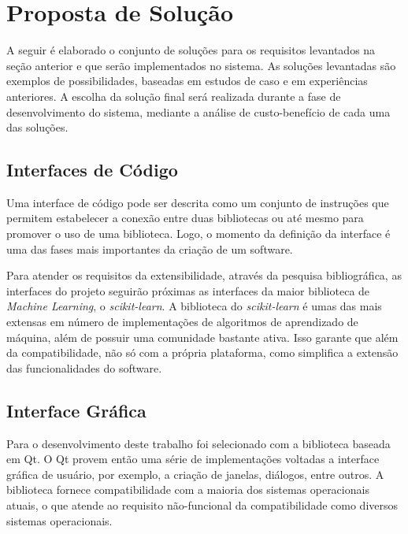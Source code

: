 

\section{Proposta de Solução}
    \label{sec:proposta-de-solucao}

    A seguir é elaborado o conjunto de soluções para os requisitos levantados na seção anterior e que serão implementados no sistema. As soluções levantadas são exemplos de possibilidades, baseadas em estudos de caso e em experiências anteriores. A escolha da solução final será realizada durante a fase de desenvolvimento do sistema, mediante a análise de custo-benefício de cada uma das soluções.

    \subsection{Interfaces de Código}

    Uma interface de código pode ser descrita como um conjunto de instruções que permitem estabelecer a conexão entre duas bibliotecas ou até mesmo para promover o uso de uma biblioteca. Logo, o momento da definição da interface é uma das fases mais importantes da criação de um software.

    Para atender os requisitos da extensibilidade, através da pesquisa bibliográfica, as interfaces do projeto seguirão próximas as interfaces da maior biblioteca de \textit{Machine Learning}, o \textit{scikit-learn}. A biblioteca do \textit{scikit-learn} é umas das mais extensas em número de implementações de algoritmos de aprendizado de máquina, além de possuir uma comunidade bastante ativa. Isso garante que além da compatibilidade, não só com a própria plataforma, como simplifica a extensão das funcionalidades do software.

    \subsection{Interface Gráfica}

    Para o desenvolvimento deste trabalho foi selecionado com a biblioteca baseada em Qt. O Qt provem então uma série de implementações voltadas a interface gráfica de usuário, por exemplo, a criação de janelas, diálogos, entre outros. A biblioteca fornece compatibilidade com a maioria dos sistemas operacionais atuais, o que atende ao requisito não-funcional da compatibilidade como diversos sistemas operacionais.

